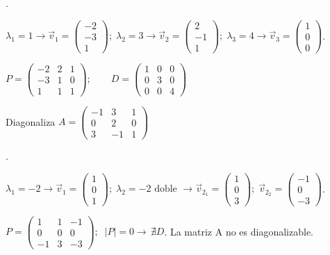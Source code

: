 \begin{proofw}\renewcommand{\qedsymbol}{$\diamond$}.

\noindent \small{$ \lambda_1=1 \longrightarrow \vec v_1=\left( \begin{matrix} -2\\-3\\1 \end{matrix}\right); \; \lambda_2=3 \longrightarrow \vec v_2=\left( \begin{matrix} 2\\-1\\1 \end{matrix}\right); \;\lambda_3=4 \longrightarrow \vec v_3=\left( \begin{matrix} 1\\0\\0 \end{matrix}\right)$}\normalsize{.}

$P=\left(\begin{matrix} -2&2&1\\-3&1&0\\1&1&1  \end{matrix}\right); \qquad D=\left(\begin{matrix} 1&0&0\\0&3&0\\0&0&4  \end{matrix}\right)$

\end{proofw}
	
\begin{ejre}
	Diagonaliza $A=\left(\begin{matrix} -1&3&1\\0&2&0\\3&-1&1  \end{matrix}\right)$
\end{ejre}

\begin{proofw}\renewcommand{\qedsymbol}{$\diamond$}.

\noindent \small{$ \lambda_1=-2 \longrightarrow \vec v_1=\left( \begin{matrix} 1\\0\\1 \end{matrix}\right); \; \lambda_2=-2 \text { doble } \longrightarrow \vec v_{2_1}=\left( \begin{matrix} 1\\0\\3 \end{matrix}\right); \;\vec v_{2_2}=\left( \begin{matrix} -1\\0\\-3 \end{matrix}\right)$}\normalsize{.}

$P=\left(\begin{matrix} 1&1&-1\\0&0&0\\-1&3&-3  \end{matrix}\right);\; \; |P|=0 \longrightarrow \, \nexists D$. La matriz A no es diagonalizable.
	
\end{proofw}

